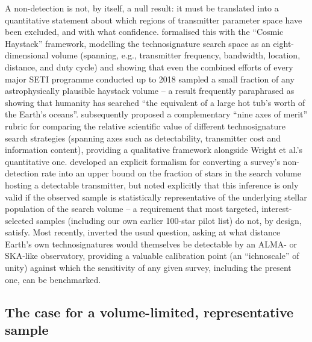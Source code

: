 \documentclass{openjournal}
\begin{document}
A non-detection is not, by itself, a null result: it must be translated into a
quantitative statement about which regions of transmitter parameter space have
been excluded, and with what confidence. \citet{Wright2018} formalised this with
the ``Cosmic Haystack'' framework, modelling the technosignature search space as
an eight-dimensional volume (spanning, e.g., transmitter frequency, bandwidth,
location, distance, and duty cycle) and showing that even the combined efforts of
every major SETI programme conducted up to 2018 sampled a small fraction
of any astrophysically plausible haystack volume -- a result frequently
paraphrased as showing that humanity has searched ``the equivalent of a large
hot tub's worth of the Earth's oceans''. \citet{Sheikh2020} subsequently proposed
a complementary ``nine axes of merit'' rubric for comparing the relative
scientific value of different technosignature search strategies (spanning axes
such as detectability, transmitter cost and information content), providing a
qualitative framework alongside Wright et al.'s quantitative one.
\citet{Margot2023} developed an explicit formalism for converting a survey's
non-detection rate into an upper bound on the fraction of stars in the search
volume hosting a detectable transmitter, but noted explicitly that this
inference is only valid if the observed sample is statistically representative
of the underlying stellar population of the search volume -- a requirement that
most targeted, interest-selected samples (including our own earlier 100-star
pilot list) do not, by design, satisfy. Most recently, \citet{EarthDetectingEarth2025}
inverted the usual question, asking at what distance Earth's own technosignatures
would themselves be detectable by an ALMA- or SKA-like observatory, providing a
valuable calibration point (an ``ichnoscale'' of unity) against which the
sensitivity of any given survey, including the present one, can be benchmarked.

\subsection{The case for a volume-limited, representative sample}
\label{sec:volumelimited}
\end{document}

